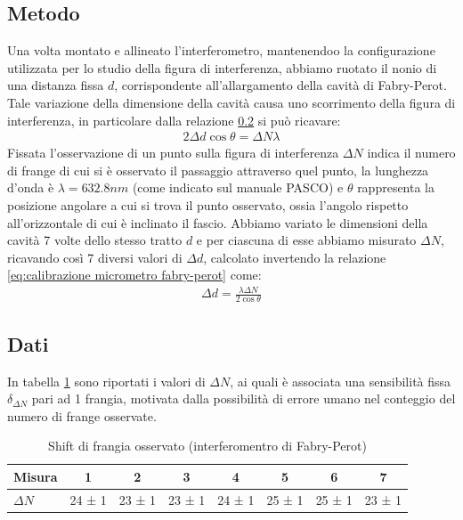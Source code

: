 \documentclass[a4paper]{article}
\begin{document}
\subsection{Metodo}
Una volta montato e allineato l'interferometro, mantenendoo la configurazione utilizzata per lo studio della figura di interferenza, abbiamo ruotato il 
nonio di una distanza fissa $d$, corrispondente all'allargamento della cavità di Fabry-Perot. Tale variazione della dimensione della cavità causa uno
scorrimento della figura di interferenza, in particolare dalla relazione \ref{} si può ricavare:
\begin{align}
    2 \Delta d \cos  \theta = \Delta N \lambda
\label{eq:calibrazione micrometro fabry-perot}
\end{align}
Fissata l'osservazione di un punto sulla figura di interferenza $\Delta N$ indica il numero di frange di cui si è osservato il passaggio attraverso quel punto, la lunghezza d'onda è $\lambda = 632.8 nm$ (come indicato sul manuale PASCO) e $\theta$ rappresenta la posizione angolare a cui si trova il punto osservato, ossia l'angolo rispetto all'orizzontale di cui è inclinato il fascio.
Abbiamo variato le dimensioni della cavità 7 volte dello stesso tratto $d$ e per ciascuna di esse abbiamo misurato $\Delta N$, ricavando così 7 diversi valori di $\Delta d$, calcolato invertendo la relazione \ref{eq:calibrazione micrometro fabry-perot} come:
\begin{align}
    \Delta d = \frac{\lambda \Delta N}{2\cos{\theta}}
\label{eq:calibrazione micrometro fabry-perot invertita}
\end{align}

\subsection{Dati}
In tabella \ref{tab: micrometro fabry-perot} sono riportati i valori di $\Delta N$, ai quali è associata una sensibilità fissa $\delta_{\Delta N}$ pari ad 1 frangia, motivata dalla possibilità di errore umano nel conteggio del numero di frange osservate.

\begin{table}[htbp]
\centering
\caption{Shift di frangia osservato (interferomentro di Fabry-Perot)}
\begin{tabular}{|l|ccccccc|}
\hline
Misura & 1 & 2 & 3 & 4 & 5 & 6 & 7 \\\hline\hline
$\Delta N$ & 24 ± 1 & 23 ± 1 & 23 ± 1 & 24 ± 1 & 25 ± 1 & 25 ± 1 & 23 ± 1 \\\hline
\end{tabular}
\label{tab: micrometro fabry-perot}
\end{table}
\end{document}
